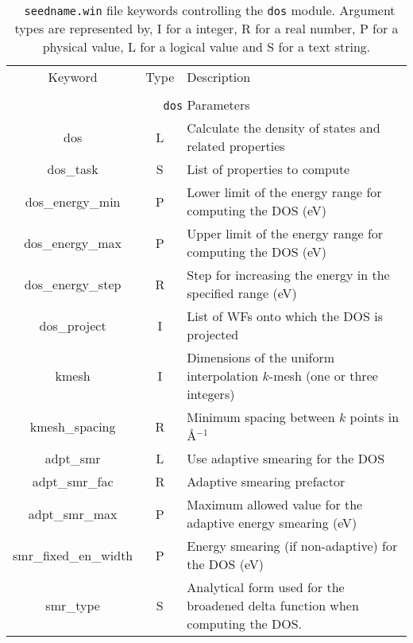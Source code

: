 \begin{table}[h!]
\begin{center}
\begin{tabular}{|c|c|p{6cm}|}
  \hline
  Keyword & Type & Description \\
  &      &             \\
  \hline\hline
  \multicolumn{3}{|c|}{{\tt dos} Parameters} \\
  \hline
  {\sc dos}  & L & Calculate the density of states and related properties\\
  {\sc dos\_task}& S  & List of properties to compute \\
  {\sc dos\_energy\_min} & P & Lower limit of the energy range for
  computing the DOS (eV)\\
  {\sc dos\_energy\_max}& P & Upper limit of the energy range for
  computing the DOS (eV)\\
  {\sc dos\_energy\_step}& R & Step for increasing the energy in the specified range (eV)\\
  {\sc dos\_project}& I & List of WFs onto which the DOS is projected\\
  {\sc [dos\_]kmesh} & I & Dimensions of the uniform interpolation $k$-mesh (one or three integers)\\ 
  {\sc [dos\_]kmesh\_spacing}& R & Minimum spacing between $k$ points in \AA$^{-1}$\\
  {\sc [dos\_]adpt\_smr} & L & Use adaptive smearing for the DOS \\
  {\sc [dos\_]adpt\_smr\_fac} & R & Adaptive smearing prefactor\\
  {\sc [dos\_]adpt\_smr\_max} & P & Maximum allowed value for the adaptive energy smearing (eV) \\
  {\sc [dos\_]smr\_fixed\_en\_width} & P  & Energy smearing (if non-adaptive) for the DOS (eV) \\   
  {\sc [dos\_]smr\_type} & S & Analytical form used for the broadened delta function
  when computing the DOS. \\
  \hline
\end{tabular}
\caption[Parameter file keywords controlling the DOS module.]  {{\tt
    seedname.win} file keywords controlling the {\tt dos}
  module. Argument types are represented by, I for a integer, R for a
  real number, P for a physical value, L for a logical value and S for
  a text string.}
\label{parameter_keywords_dos}
\end{center}
\end{table}


